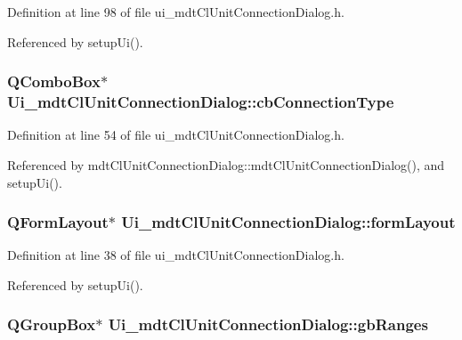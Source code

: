 Definition at line 98 of file ui\-\_\-mdt\-Cl\-Unit\-Connection\-Dialog.\-h.



Referenced by setup\-Ui().

\hypertarget{class_ui__mdt_cl_unit_connection_dialog_aaea7692576ca1faa994ed113ec00bc0a}{
\subsubsection[{cb\-Connection\-Type}]{\setlength{\rightskip}{0pt plus 5cm}Q\-Combo\-Box$\ast$ Ui\-\_\-mdt\-Cl\-Unit\-Connection\-Dialog\-::cb\-Connection\-Type}}\label{class_ui__mdt_cl_unit_connection_dialog_aaea7692576ca1faa994ed113ec00bc0a}


Definition at line 54 of file ui\-\_\-mdt\-Cl\-Unit\-Connection\-Dialog.\-h.



Referenced by mdt\-Cl\-Unit\-Connection\-Dialog\-::mdt\-Cl\-Unit\-Connection\-Dialog(), and setup\-Ui().

\hypertarget{class_ui__mdt_cl_unit_connection_dialog_aa5bed80735c5d7290ad926c4a6f8cda7}{
\subsubsection[{form\-Layout}]{\setlength{\rightskip}{0pt plus 5cm}Q\-Form\-Layout$\ast$ Ui\-\_\-mdt\-Cl\-Unit\-Connection\-Dialog\-::form\-Layout}}\label{class_ui__mdt_cl_unit_connection_dialog_aa5bed80735c5d7290ad926c4a6f8cda7}


Definition at line 38 of file ui\-\_\-mdt\-Cl\-Unit\-Connection\-Dialog.\-h.



Referenced by setup\-Ui().

\hypertarget{class_ui__mdt_cl_unit_connection_dialog_acd53dcfd25bd72639d65e9059955df7d}{
\subsubsection[{gb\-Ranges}]{\setlength{\rightskip}{0pt plus 5cm}Q\-Group\-Box$\ast$ Ui\-\_\-mdt\-Cl\-Unit\-Connection\-Dialog\-::gb\-Ranges}}\label{class_ui__mdt_cl_unit_connection_dialog_acd53dcfd25bd72639d65e9059955df7d}



